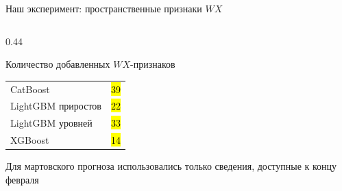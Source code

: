 \begin{frame}[t]{Наш эксперимент: пространственные признаки $WX$}
\begin{columns}[T,onlytextwidth]
\begin{column}{0.44\textwidth}
      \begin{block}{Количество добавленных $WX$-признаков}
        \VladimirText
        \renewcommand{\arraystretch}{1.35}
        \setlength{\tabcolsep}{2pt}
        \begin{tabular*}{\linewidth}{@{\extracolsep{\fill}}lr@{}}
          CatBoost & \hl{39} \\
          LightGBM приростов & \hl{22} \\
          LightGBM уровней & \hl{33} \\
          XGBoost & \hl{14}
        \end{tabular*}
      \end{block}
      \vspace{0.25ex}
      {\VladimirText\color{hsegray}Для мартовского прогноза использовались только сведения, доступные к концу февраля}
    \end{column}
  \end{columns}
\end{frame}

